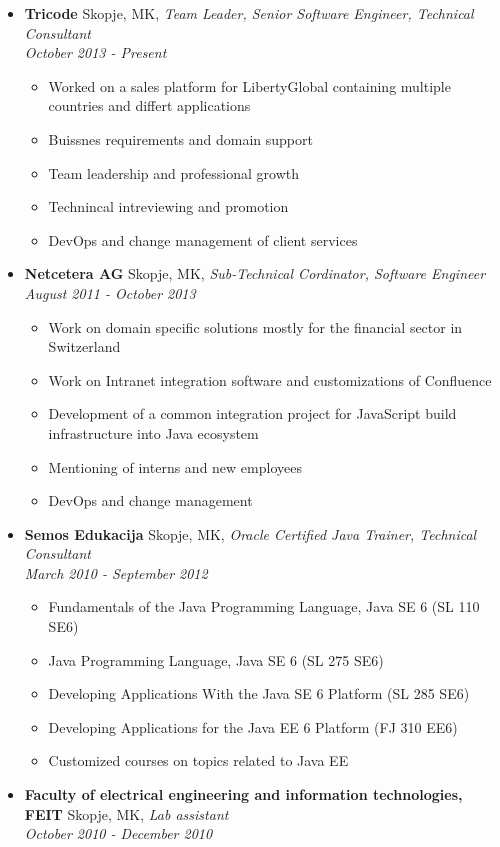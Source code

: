 \documentclass[letterpaper,11pt]{article}
\newcommand{\resitem}[1]{\item #1 \vspace{-2pt}}
\newcommand{\ressubheading}[4]{
  \textbf{#1}  #2,
  \textit{#3}\\ \textit{#4}\\
}
\begin{document}

\begin{itemize}

\item []  
\ressubheading{Tricode}{Skopje, MK}{Team Leader, Senior Software Engineer, Technical Consultant}{October 2013 - Present}
	\begin{itemize}
      \resitem{ Worked on a sales platform for LibertyGlobal containing  multiple countries and differt applications}
      \resitem{ Buissnes requirements and domain support}     
      \resitem{ Team leadership and professional growth}
      \resitem{ Technincal intreviewing and promotion }
      \resitem{ DevOps and change management of client services}
	\end{itemize}


\item []  
\ressubheading{Netcetera AG}{Skopje, MK}{Sub-Technical Cordinator, Software Engineer}{August 2011 - October 2013}
	\begin{itemize}
      \resitem{ Work on domain specific solutions mostly for the financial sector in Switzerland}
      \resitem{ Work on Intranet integration software and customizations of Confluence}     
      \resitem{ Development of a common integration project for JavaScript build infrastructure into Java ecosystem}
      \resitem{ Mentioning of interns and new employees }
      \resitem{ DevOps and change management}
	\end{itemize}

\item []

	\ressubheading{Semos Edukacija }{Skopje, MK}{ Oracle Certified Java Trainer, Technical Consultant }{March 2010 - September 2012}

	\begin{itemize}
 
      \resitem{Fundamentals of the Java Programming Language, Java SE 6 (SL 110 SE6) }
      \resitem{Java Programming Language, Java SE 6 (SL 275 SE6) }
      \resitem{Developing Applications With the Java SE 6 Platform (SL 285 SE6)}
      \resitem{Developing Applications for the Java EE 6 Platform (FJ 310 EE6)}
      \resitem{Customized courses on topics related to Java EE}

	\end{itemize}
	
\item []

	\ressubheading{Faculty of electrical engineering and information technologies, FEIT }{Skopje, MK}{Lab assistant}{October 2010 - December 2010}


\end{itemize}
\end{document}
